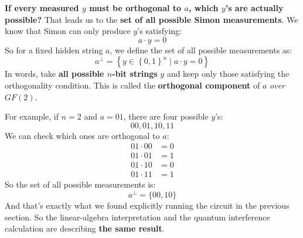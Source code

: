 \highspace
\textcolor{Green3}{ \textbf{If every measured $y$ must be orthogonal to $a$, which $y$'s are actually possible?}} That leads us to the \textbf{set of all possible Simon measurements}. We know that Simon can only produce $y$'s satisfying:
\begin{equation*}
    a \cdot y = 0
\end{equation*}
So for a fixed hidden string $a$, we define the set of all possible measurements as:
\begin{equation}
    a^{\perp} = \left\{
        y \in \left\{0,1\right\}^{n} \mid a \cdot y = 0
    \right\}
\end{equation}
In words, take \textbf{all possible $n$-bit strings} $y$ and keep only those satisfying the orthogonality condition. This is called the \textbf{orthogonal component} of $a$ \emph{over} $GF(2)$.

\highspace
For example, if $n=2$ and $a = 01$, there are four possible $y$'s:
\begin{equation*}
    00, 01, 10, 11
\end{equation*}
We can check which ones are orthogonal to $a$:
\begin{align*}
    01 \cdot 00 &= 0 \\
    01 \cdot 01 &= 1 \\
    01 \cdot 10 &= 0 \\
    01 \cdot 11 &= 1
\end{align*}
So the set of all possible measurements is:
\begin{equation*}
    a^{\perp} = \{00, 10\}
\end{equation*}
And that's exactly what we found explicitly running the circuit in the previous section. So the linear-algebra interpretation and the quantum interference calculation are describing \textbf{the same result}.

